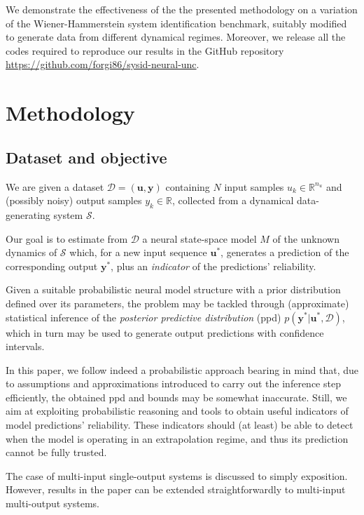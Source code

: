 \documentclass{ifacconf}
\newcommand{\nin}{{n_u}}
\newcommand{\nsamp}{N}
\newcommand{\tvec}[1]{{\mathbf{#1}}}
\newcommand{\D}{\mathcal{D}} %
\begin{document}
We demonstrate the effectiveness of the the presented methodology on a variation of the Wiener-Hammerstein \cite{schoukens2009wiener} system identification benchmark, suitably modified to generate data from different dynamical regimes. Moreover, we release all the codes required to reproduce our results in the GitHub repository \url{https://github.com/forgi86/sysid-neural-unc}.



\section{Methodology}
\subsection{Dataset and objective}
We are given a dataset $\D=(\tvec{u}, \tvec{y})$ containing $\nsamp$ input samples $u_k \in \mathbb{R}^{\nin}$ and (possibly noisy) output samples $y_k \in \mathbb{R}$, collected from a dynamical data-generating system $\mathcal{S}$. 

Our goal is to estimate from $\D$ a neural state-space model $M$ of the unknown dynamics of $\mathcal{S}$ which, for a new input sequence $\tvec{u}^*$, generates a prediction of the corresponding output ${\tvec{y}}^*$, plus an \emph{indicator} of the predictions' reliability. 

Given a suitable probabilistic neural model structure with a prior distribution defined over its parameters, the problem may be tackled through (approximate) statistical inference of the \emph{posterior predictive distribution}  (ppd) $p(\tvec{y}^* | \tvec{u}^*, \D)$, which in turn may be used to generate output predictions with confidence intervals. 

In this paper, we follow indeed a probabilistic approach bearing in mind that, due to assumptions and approximations introduced to carry out the inference step efficiently, the obtained ppd and bounds may be somewhat inaccurate. Still, we aim at exploiting probabilistic reasoning and tools to obtain  useful
indicators of model predictions' reliability. These indicators should (at least) be able to detect when the model is operating in an extrapolation
regime, and thus its prediction cannot be fully trusted.

The case of multi-input single-output systems is discussed to simply exposition. However, results in the paper can be extended straightforwardly to multi-input multi-output systems. 
\end{document}
